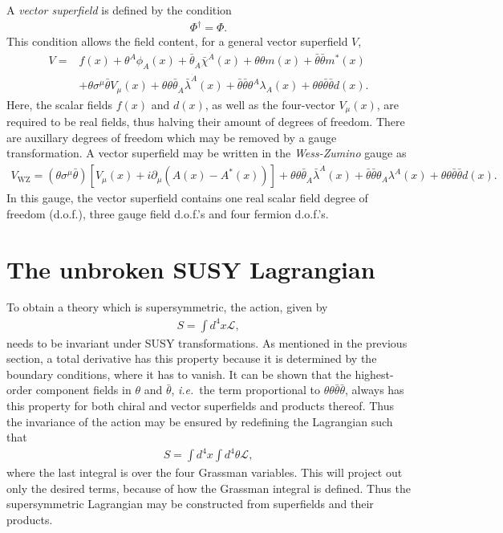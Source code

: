 A {\it vector superfield} is defined by the condition
\begin{align}
	\Phi^\dag = \Phi.
\end{align}
This condition allows the field content, for a general vector superfield $V$,
\begin{align}
	V = &f(x) + \theta^A\phi_A(x) + \bar\theta_{\dot A}\bar\chi^{\dot A}(x) + \theta \theta m(x) + \bar\theta \bar\theta m^*(x)\\
	 &+ \theta\sigma^\mu \bar\theta V_\mu(x) + \theta\theta\bar\theta_{\dot A}\bar\lambda^{\dot A}(x) + \bar\theta \bar\theta \theta^A \lambda_A(x) + \theta \theta \bar\theta \bar\theta d(x).
\end{align}
Here, the scalar fields $f(x)$ and $d(x)$, as well as the four-vector $V_\mu (x)$, are required to be real fields, thus halving their amount of degrees of freedom. There are auxillary degrees of freedom which may be removed by a gauge transformation. A vector superfield may be written in the {\it Wess-Zumino} gauge as
\begin{align}
	V_\mathrm{WZ} = (\theta \sigma^\mu \bar\theta) \left[ V_\mu(x) + i\partial_\mu (A(x) - A^*(x)) \right] + \theta\theta \bar\theta_{\dot A} \bar\lambda^{\dot A}(x) + \bar\theta \bar\theta \theta_A \lambda^A(x) + \theta\theta \bar\theta \bar\theta d(x).
\end{align}
In this gauge, the vector superfield contains one real scalar field degree of freedom (d.o.f.), three gauge field d.o.f.'s and four fermion d.o.f.'s.

\section{The unbroken SUSY Lagrangian}
To obtain a theory which is supersymmetric, the action, given by
\begin{align}
 	S = \int d^4 x \mathcal{L},
 \end{align}
 needs to be invariant under SUSY transformations. As mentioned in the previous section, a total derivative has this property because it is determined by the boundary conditions, where it has to vanish. It can be shown that the highest-order component fields in $\theta$ and $\bar \theta$, {\it i.e.}\ the term proportional to $\theta\theta\bar\theta\bar\theta$, always has this property for both chiral and vector superfields and products thereof. Thus the invariance of the action may be ensured by redefining the Lagrangian such that
 \begin{align}
 	S = \int d^4 x \int d^4 \theta \mathcal{L},
 \end{align}
 where the last integral is over the four Grassman variables. This will project out only the desired terms, because of how the Grassman integral is defined. Thus the supersymmetric Lagrangian may be constructed from superfields and their products.

